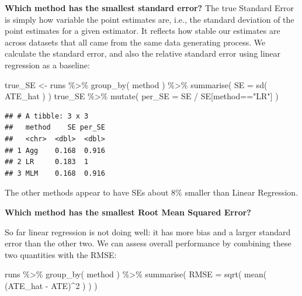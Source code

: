 \documentclass[
]{book}
\newenvironment{Shaded}{\begin{snugshade}}{\end{snugshade}}
\newcommand{\AttributeTok}[1]{\textcolor[rgb]{0.77,0.63,0.00}{#1}}
\newcommand{\DecValTok}[1]{\textcolor[rgb]{0.00,0.00,0.81}{#1}}
\newcommand{\FunctionTok}[1]{\textcolor[rgb]{0.00,0.00,0.00}{#1}}
\newcommand{\NormalTok}[1]{#1}
\newcommand{\OtherTok}[1]{\textcolor[rgb]{0.56,0.35,0.01}{#1}}
\newcommand{\SpecialCharTok}[1]{\textcolor[rgb]{0.00,0.00,0.00}{#1}}
\newcommand{\StringTok}[1]{\textcolor[rgb]{0.31,0.60,0.02}{#1}}
\begin{document}
\textbf{Which method has the smallest standard error?}
The true Standard Error is simply how variable the point estimates are, i.e., the standard deviation of the point estimates for a given estimator.
It reflects how stable our estimates are across datasets that all came from the same data generating process.
We calculate the standard error, and also the relative standard error using linear regression as a baseline:

\begin{Shaded}
\begin{Highlighting}[]
\NormalTok{true\_SE }\OtherTok{\textless{}{-}}\NormalTok{ runs }\SpecialCharTok{\%\textgreater{}\%} 
  \FunctionTok{group\_by}\NormalTok{( method ) }\SpecialCharTok{\%\textgreater{}\%}
  \FunctionTok{summarise}\NormalTok{( }
    \AttributeTok{SE =} \FunctionTok{sd}\NormalTok{( ATE\_hat )}
\NormalTok{  )}
\NormalTok{true\_SE }\SpecialCharTok{\%\textgreater{}\%}
  \FunctionTok{mutate}\NormalTok{( }\AttributeTok{per\_SE =}\NormalTok{ SE }\SpecialCharTok{/}\NormalTok{ SE[method}\SpecialCharTok{==}\StringTok{"LR"}\NormalTok{] )}
\end{Highlighting}
\end{Shaded}

\begin{verbatim}
## # A tibble: 3 x 3
##   method    SE per_SE
##   <chr>  <dbl>  <dbl>
## 1 Agg    0.168  0.916
## 2 LR     0.183  1    
## 3 MLM    0.168  0.916
\end{verbatim}

The other methods appear to have SEs about 8\% smaller than Linear Regression.

\textbf{Which method has the smallest Root Mean Squared Error?}

So far linear regression is not doing well: it has more bias and a larger standard error than the other two.
We can assess overall performance by combining these two quantities with the RMSE:

\begin{Shaded}
\begin{Highlighting}[]
\NormalTok{runs }\SpecialCharTok{\%\textgreater{}\%} 
  \FunctionTok{group\_by}\NormalTok{( method ) }\SpecialCharTok{\%\textgreater{}\%}
  \FunctionTok{summarise}\NormalTok{( }
    \AttributeTok{RMSE =} \FunctionTok{sqrt}\NormalTok{( }\FunctionTok{mean}\NormalTok{( (ATE\_hat }\SpecialCharTok{{-}}\NormalTok{ ATE)}\SpecialCharTok{\^{}}\DecValTok{2}\NormalTok{ ) )}
\NormalTok{  )}
\end{Highlighting}
\end{Shaded}
\end{document}
